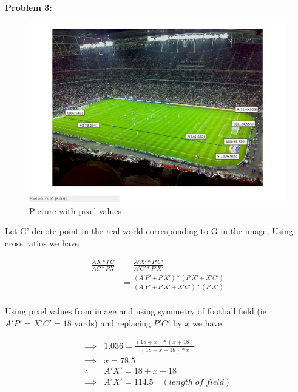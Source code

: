 \documentclass[a4paper]{article}
\begin{document}
\maketitle
\hrulefill




\textbf{\newline Problem 3:}

\begin{figure}[ht!]
 \centering
\caption{Picture with pixel values}
\includegraphics[width=1\textwidth]{Q2/input/measured.jpg}
\end{figure}

Let G' denote point in the real world corresponding to G in the image, 
 Using cross ratios we have 

\begin{equation*} 
\begin{split}
 \frac{AX*PC}{AC*PX} &= \frac{A'X'*P'C'}{A'C'*P'X'} \\
\ &= \frac{(A'P'+P'X')*(P'X'+X'C')}{(A'P'+P'X'+X'C')*(P'X')} \\
 \end{split}
\end{equation*}

Using pixel values from image and using symmetry of football field (ie $A'P' = X'C' = 18$ yards) and replacing $P'C'$ by $x$ we have

\begin{equation*} 
\begin{split}
\implies & 1.036 = \frac{(18+x)*(x+18)}{(18+x+18)*x}\\
\implies & x = 78.5\\
\therefore \quad & A'X' = 18+x+18 \\
\implies & A'X' =  114.5 \quad (length \; of \; field)\\
 \end{split}
\end{equation*}
\end{document}
